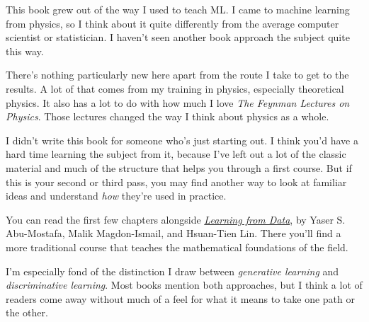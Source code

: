 
This book grew out of the way I used to teach ML. I came to machine learning from physics, so I think about it quite differently from the average computer scientist or statistician. I haven't seen another book approach the subject quite this way.

There's nothing particularly new here apart from the route I take to get to the results. A lot of that comes from my training in physics, especially theoretical physics. It also has a lot to do with how much I love \emph{The Feynman Lectures on Physics}. Those lectures changed the way I think about physics as a whole.

I didn't write this book for someone who's just starting out. I think you'd have a hard time learning the subject from it, because I've left out a lot of the classic material and much of the structure that helps you through a first course. But if this is your second or third pass, you may find another way to look at familiar ideas and understand \emph{how} they're used in practice.

You can read the first few chapters alongside \href{https://amlbook.com/}{\emph{Learning from Data}}, by Yaser S. Abu-Mostafa, Malik Magdon-Ismail, and Hsuan-Tien Lin. There you'll find a more traditional course that teaches the mathematical foundations of the field.

I'm especially fond of the distinction I draw between \emph{generative learning} and \emph{discriminative learning}. Most books mention both approaches, but I think a lot of readers come away without much of a feel for what it means to take one path or the other.
